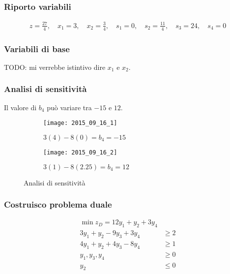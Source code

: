 \documentclass[\main/main.tex]{subfiles}
\begin{document}
\subsubsection*{Riporto variabili}

\begin{align*}
  z   = \frac{27}{4}, \quad
  x_1 = 3           , \quad
  x_2 = \frac{3}{4} , \quad
  s_1 = 0           , \quad
  s_2 = \frac{11}{4}, \quad
  s_3 = 24          , \quad
  s_4 = 0
\end{align*}
\subsubsection*{Variabili di base}
TODO: mi verrebbe istintivo dire $x_1$ e $x_2$.

\subsubsection*{Analisi di sensitività}
Il valore di $b_4$ può variare tra $-15$ e $12$.

\begin{figure}
  \begin{subfigure}{0.49\textwidth}
    \texttt{[image: 2015\_09\_16\_1]}
    \caption{$3(4)-8(0)= b_4 = -15$}
  \end{subfigure}
  \begin{subfigure}{0.49\textwidth}
    \texttt{[image: 2015\_09\_16\_2]}
    \caption{$3(1)-8(2.25)= b_4 = 12$}
  \end{subfigure}
  \caption{Analisi di sensitività}
\end{figure}

\subsubsection*{Costruisco problema duale}
\begin{align*}
  \min z_D = 12y_1 + y_2 + 3y_4    \\
  3y_1 + y_2 - 9y_3 +3y_4 & \geq 2 \\
  4y_1 + y_2 + 4y_3 -8y_4 & \geq 1 \\
  y_1, y_3, y_4           & \geq 0 \\
  y_2                     & \leq 0
\end{align*}
\end{document}
